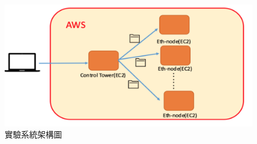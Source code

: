 \begin{figure}[htbp]
\centering
\includegraphics[scale=0.5]{images/51.png}
\caption{實驗系統架構圖}
\label{i:byz-latency}
\end{figure}